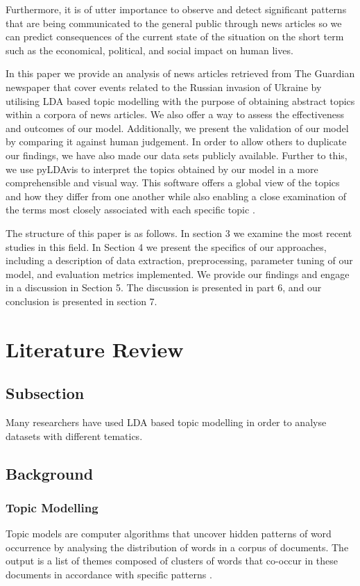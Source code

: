 \documentclass[twoside,12pt,a4paper]{article}
\begin{document}
Furthermore, it is of utter importance to observe and detect significant patterns that are being communicated to the general public through news articles so we can predict consequences of the current state of the situation on the short term such as the economical, political, and social impact on human lives.

In this paper we provide an analysis of news articles retrieved from The Guardian newspaper that cover events related to the Russian invasion of Ukraine by utilising LDA based topic modelling with the purpose of obtaining abstract topics within a corpora of news articles. We also offer a way to assess the effectiveness and outcomes of our model. Additionally, we present the validation of our model by comparing it against human judgement. In order to allow others to duplicate our findings, we have also made our data sets publicly available. Further to this, we use pyLDAvis to interpret the topics obtained by our model in a more comprehensible and visual way. This software offers a global view of the topics and how they differ from one another while also enabling a close examination of the terms most closely associated with each specific topic \citep{sievert_ldavis_2014}.

The structure of this paper is as follows. In section 3 we examine the most recent studies in this field. In Section 4 we present the specifics of our approaches, including a description of data extraction, preprocessing, parameter tuning of our model, and evaluation metrics implemented. We provide our findings and engage in a discussion in Section 5. The discussion is presented in part 6, and our conclusion is presented in section 7.

\clearpage
\section{Literature Review}
\subsection{Subsection}
Many researchers have used LDA based topic modelling in order to analyse datasets with different tematics.

\subsection{Background}
\subsubsection{Topic Modelling}
Topic models are computer algorithms that uncover hidden patterns of word occurrence by analysing the distribution of words in a corpus of documents. The output is a list of themes composed of clusters of words that co-occur in these documents in accordance with specific patterns \citep{jacobi_quantitative_2016}. 
\end{document}
